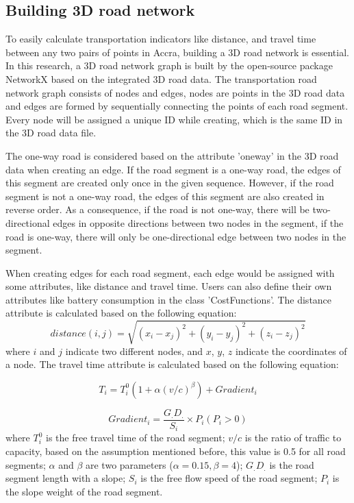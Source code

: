 \documentclass[final-report]{report-template}
\begin{document}
\subsection{Building 3D road network}
To easily calculate transportation indicators like distance, and travel time between any two pairs of points in Accra, building a 3D road network is essential.
In this research, a 3D road network graph is built by the open-source package NetworkX based on the integrated 3D road data.
The transportation road network graph consists of nodes and edges, nodes are points in the 3D road data and edges are formed by sequentially connecting the points of each road segment.   
Every node will be assigned a unique ID while creating, which is the same ID in the 3D road data file.

The one-way road is considered based on the attribute 'oneway' in the 3D road data when creating an edge.
If the road segment is a one-way road, the edges of this segment are created only once in the given sequence. 
However, if the road segment is not a one-way road, the edges of this segment are also created in reverse order.
As a consequence, if the road is not one-way, there will be two-directional edges in opposite directions between two nodes in the segment,
if the road is one-way, there will only be one-directional edge between two nodes in the segment.

When creating edges for each road segment, each edge would be assigned with some attributes, like distance and travel time.
Users can also define their own attributes like battery consumption in the class 'CostFunctions'. 
The distance attribute is calculated based on the following equation:
\begin{equation}
    distance(i,j) = \sqrt{(x_i-x_j)^2 + (y_i-y_j)^2 + (z_i-z_j)^2}
\end{equation}
where $i$ and $j$ indicate two different nodes, and $x$, $y$, $z$ indicate the coordinates of a node.
The travel time attribute is calculated based on the following equation:

\begin{equation}
    T_i = T_i^0(1+\alpha(v/c)^\beta)+Gradient_i
\end{equation}

\begin{equation}
    Gradient_i = \frac{G_.D_.}{S_i} \times P_i(P_i>0)
\end{equation}
where $T_i^0$ is the free travel time of the road segment; 
$v/c$ is the ratio of traffic to capacity, based on the assumption mentioned before, this value is 0.5 for all road segments;
$\alpha$ and $\beta$ are two parameters ($\alpha=0.15, \beta=4$); $G_.D_.$ is the road segment length with a slope;
$S_i$ is the free flow speed of the road segment; $P_i$ is the slope weight of the road segment. 
\end{document}
